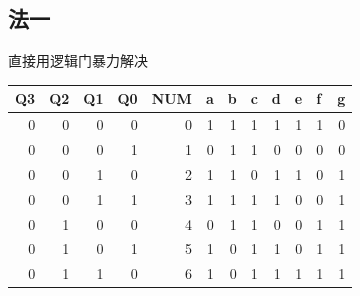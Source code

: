 \documentclass[11pt,UTF8]{ctexart}
\begin{document}
\subsection{法一}
直接用逻辑门暴力解决
\begin{table}[H]
  \centering
    \begin{tabular}{|r|r|r|r|r|r|r|r|r|r|r|r|}
\hline    \multicolumn{1}{|l|}{Q3} & \multicolumn{1}{l|}{Q2} & \multicolumn{1}{l|}{Q1} & \multicolumn{1}{l|}{Q0} & \multicolumn{1}{l|}{NUM} & \multicolumn{1}{l|}{a} & \multicolumn{1}{l|}{b} & \multicolumn{1}{l|}{c} & \multicolumn{1}{l|}{d} & \multicolumn{1}{l|}{e} & \multicolumn{1}{l|}{f} & \multicolumn{1}{l|}{g}   \\
\hline    0     & 0     & 0     & 0     & 0     & \textcolor[rgb]{ 1,  0,  0}{1} & \textcolor[rgb]{ 1,  0,  0}{1} & \textcolor[rgb]{ 1,  0,  0}{1} & \textcolor[rgb]{ 1,  0,  0}{1} & \textcolor[rgb]{ 1,  0,  0}{1} & \textcolor[rgb]{ 1,  0,  0}{1} & 0    \\
\hline    0     & 0     & 0     & 1     & 1     & 0     & \textcolor[rgb]{ 1,  0,  0}{1} & \textcolor[rgb]{ 1,  0,  0}{1} & 0     & 0     & 0     & 0    \\
\hline    0     & 0     & 1     & 0     & 2     & \textcolor[rgb]{ 1,  0,  0}{1} & \textcolor[rgb]{ 1,  0,  0}{1} & 0     & \textcolor[rgb]{ 1,  0,  0}{1} & \textcolor[rgb]{ 1,  0,  0}{1} & 0     & \textcolor[rgb]{ 1,  0,  0}{1} \\
\hline    0     & 0     & 1     & 1     & 3     & \textcolor[rgb]{ 1,  0,  0}{1} & \textcolor[rgb]{ 1,  0,  0}{1} & \textcolor[rgb]{ 1,  0,  0}{1} & \textcolor[rgb]{ 1,  0,  0}{1} & 0     & 0     & \textcolor[rgb]{ 1,  0,  0}{1}  \\
\hline    0     & 1     & 0     & 0     & 4     & 0     & \textcolor[rgb]{ 1,  0,  0}{1} & \textcolor[rgb]{ 1,  0,  0}{1} & 0     & 0     & \textcolor[rgb]{ 1,  0,  0}{1} & \textcolor[rgb]{ 1,  0,  0}{1}   \\
\hline    0     & 1     & 0     & 1     & 5     & \textcolor[rgb]{ 1,  0,  0}{1} & 0     & \textcolor[rgb]{ 1,  0,  0}{1} & \textcolor[rgb]{ 1,  0,  0}{1} & 0     & \textcolor[rgb]{ 1,  0,  0}{1} & \textcolor[rgb]{ 1,  0,  0}{1}   \\
\hline    0     & 1     & 1     & 0     & 6     & \textcolor[rgb]{ 1,  0,  0}{1} & 0     & \textcolor[rgb]{ 1,  0,  0}{1} & \textcolor[rgb]{ 1,  0,  0}{1} & \textcolor[rgb]{ 1,  0,  0}{1} & \textcolor[rgb]{ 1,  0,  0}{1} & \textcolor[rgb]{ 1,  0,  0}{1}   \\

\end{tabular}
\end{table}
\end{document}
